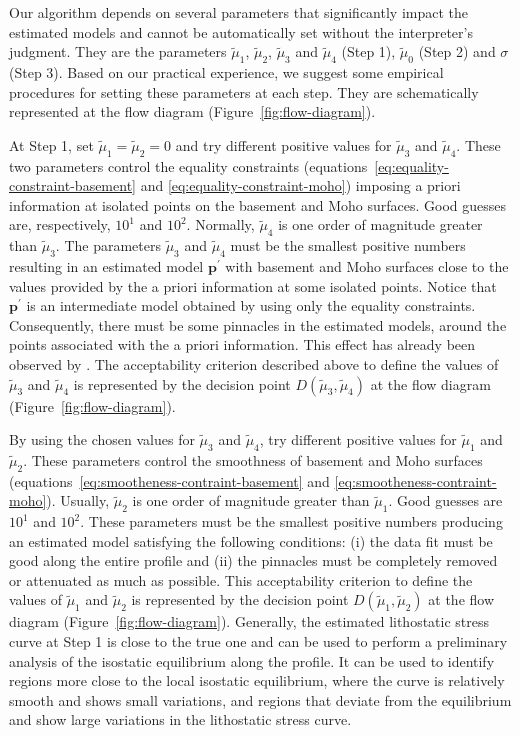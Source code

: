 \documentclass[manuscript,revised]{geophysics}
\begin{document}
Our algorithm depends on several parameters that significantly impact the estimated models
and cannot be automatically set without the interpreter’s judgment.
They are the parameters $\tilde{\mu}_{1}$, $\tilde{\mu}_{2}$, $\tilde{\mu}_{3}$ 
and $\tilde{\mu}_{4}$ (Step 1), $\tilde{\mu}_{0}$ (Step 2) and $\sigma$ (Step 3).
Based on our practical experience, we suggest some empirical procedures for setting these
parameters at each step. They are schematically represented at the flow diagram 
(Figure~\ref{fig:flow-diagram}).

At Step 1, set $\tilde{\mu}_{1} = \tilde{\mu}_{2} = 0$ and try different positive 
values for $\tilde{\mu}_{3}$ and $\tilde{\mu}_{4}$. 
These two parameters control the equality constraints
(equations~\ref{eq:equality-constraint-basement} and \ref{eq:equality-constraint-moho})
imposing a priori information at isolated points on the basement and Moho surfaces.
Good guesses are, respectively,
$10^{1}$ and $10^{2}$. Normally, $\tilde{\mu}_{4}$ is one order of magnitude greater
than $\tilde{\mu}_{3}$. 
The parameters $\tilde{\mu}_{3}$ and $\tilde{\mu}_{4}$ 
must be the smallest positive numbers resulting in an estimated model $\mathbf{p}^{\prime}$ 
with basement and Moho surfaces close to the values provided by the a priori information
at some isolated points. Notice that $\mathbf{p}^{\prime}$ is an intermediate model 
obtained by using only the equality constraints. Consequently, there must be some
pinnacles in the estimated models, around the points associated with the a priori 
information. This effect has already been observed by \citet{barbosa-etal1997}.
The acceptability criterion described above to define the values of $\tilde{\mu}_{3}$ and 
$\tilde{\mu}_{4}$ is represented by the decision point $D(\tilde{\mu}_{3}, \tilde{\mu}_{4})$ 
at the flow diagram (Figure~\ref{fig:flow-diagram}).

By using the chosen values for $\tilde{\mu}_{3}$ and $\tilde{\mu}_{4}$, 
try different positive values for $\tilde{\mu}_{1}$ and $\tilde{\mu}_{2}$.
These parameters control the smoothness of basement and Moho surfaces
(equations~\ref{eq:smootheness-contraint-basement} and \ref{eq:smootheness-contraint-moho}).
Usually, $\tilde{\mu}_{2}$ is one order of magnitude greater than $\tilde{\mu}_{1}$.
Good guesses are $10^{1}$ and $10^{2}$.
These parameters must be the smallest positive numbers producing an estimated model
satisfying the following conditions: (i) the data fit must be good along the entire profile
and (ii) the pinnacles must be completely removed or attenuated as much as possible.
This acceptability criterion to define the values of $\tilde{\mu}_{1}$ and 
$\tilde{\mu}_{2}$ is represented by the decision point $D(\tilde{\mu}_{1}, \tilde{\mu}_{2})$ 
at the flow diagram (Figure~\ref{fig:flow-diagram}).
Generally, the estimated lithostatic stress curve at Step 1 is close to the true one
and can be used to perform a preliminary analysis of the isostatic equilibrium along
the profile. It can be used to identify regions more close to the local isostatic equilibrium,
where the curve is relatively smooth and shows small variations, and regions that deviate
from the equilibrium and show large variations in the lithostatic stress curve.
\end{document}
